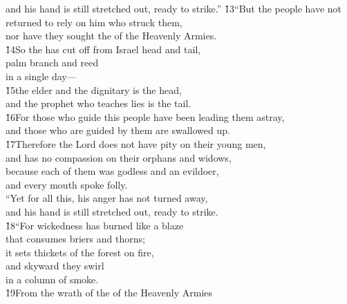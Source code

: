 \begin{poetry}
\poemll    and his hand is still stretched out, ready to strike.''
\poeml \v{13}``But the people have not returned to rely on him who struck them, \\
\poemll    nor have they sought the  of the Heavenly Armies. \\
\poeml \v{14}So the  has cut off from Israel head and tail, \\
\poemll    palm branch and reed \\
\poemlll       in a single day--- \\
\poeml \v{15}the elder and the dignitary is the head, \\
\poemll    and the prophet who teaches lies is the tail. \\
\poeml \v{16}For those who guide this people have been leading them astray, \\
\poemll    and those who are guided by them are swallowed up. \\
\poeml \v{17}Therefore the Lord does not have pity on their young men, \\
\poemll    and has no compassion on their orphans and widows, \\
\poeml because each of them was godless and an evildoer, \\
\poemll    and every mouth spoke folly. \\
\poeml ``Yet for all this, his anger has not turned away, \\
\poemll    and his hand is still stretched out, ready to strike. \\
\poeml \v{18}``For wickedness has burned like a blaze \\
\poemll    that consumes briers and thorns; \\
\poeml it sets thickets of the forest on fire, \\
\poemll    and skyward they swirl \\
\poemlll       in a column of smoke. \\
\poeml \v{19}From the wrath of the  of the Heavenly Armies \\

\end{poetry}
